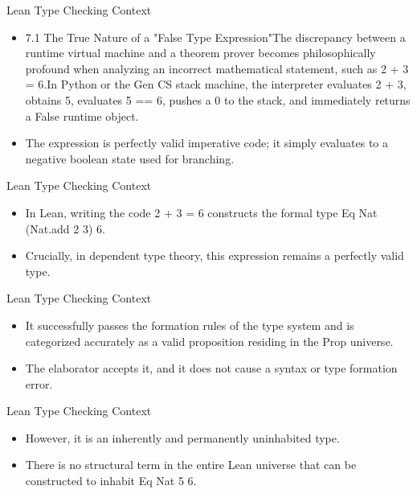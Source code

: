 \documentclass[10pt]{beamer}
\begin{document}
\begin{frame}{Lean Type Checking Context}
\begin{itemize}\setlength{\itemsep}{1.5em}
  \item 7.1 The True Nature of a "False Type Expression"The discrepancy between a runtime virtual machine and a theorem prover becomes philosophically profound when analyzing an incorrect mathematical statement, such as 2 + 3 = 6.In Python or the Gen CS stack machine, the interpreter evaluates 2 + 3, obtains 5, evaluates 5 == 6, pushes a 0 to the stack, and immediately returns a False runtime object.
  \item The expression is perfectly valid imperative code; it simply evaluates to a negative boolean state used for branching.
\end{itemize}
\end{frame}

\begin{frame}{Lean Type Checking Context}
\begin{itemize}\setlength{\itemsep}{1.5em}
  \item In Lean, writing the code 2 + 3 = 6 constructs the formal type Eq Nat (Nat.add 2 3) 6.
  \item Crucially, in dependent type theory, this expression remains a perfectly valid type.
\end{itemize}
\end{frame}

\begin{frame}{Lean Type Checking Context}
\begin{itemize}\setlength{\itemsep}{1.5em}
  \item It successfully passes the formation rules of the type system and is categorized accurately as a valid proposition residing in the Prop universe.
  \item The elaborator accepts it, and it does not cause a syntax or type formation error.
\end{itemize}
\end{frame}

\begin{frame}{Lean Type Checking Context}
\begin{itemize}\setlength{\itemsep}{1.5em}
  \item However, it is an inherently and permanently uninhabited type.
  \item There is no structural term in the entire Lean universe that can be constructed to inhabit Eq Nat 5 6.
\end{itemize}
\end{frame}
\end{document}
